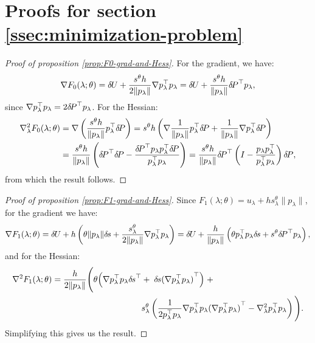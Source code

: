\documentclass[smallcondensed]{svjour3}
\begin{document}
\section{Proofs for section\@
  \ref{ssec:minimization-problem}}\label{sec:minimization-proofs}

\begin{proof}[Proof of proposition \ref{prop:F0-grad-and-Hess}]
  For the gradient, we have:
  \begin{equation*}
    \nabla F_0(\lambda; \theta) = {\delta \hspace{-0.09em} U} + \frac{s^{\theta} h}{2 \|p_\lambda\|} \nabla p_\lambda^\top p_\lambda = {\delta \hspace{-0.09em} U} + \frac{s^{\theta} h}{\|p_\lambda\|} {\delta \hspace{-0.14em} P}^\top p_\lambda,
  \end{equation*}
  since
  $\nabla p_\lambda^\top p_\lambda = 2 {\delta \hspace{-0.14em} P}^\top
  p_\lambda$. For the Hessian:
  \begin{align*}
    \nabla^2_\lambda F_0(\lambda; \theta) &= \nabla \left(\frac{s^{\theta} h}{\|p_\lambda\|} p_\lambda^\top {\delta \hspace{-0.14em} P}\right) = s^{\theta} h \left(\nabla \frac{1}{\|p_\lambda\|} p_\lambda^\top {\delta \hspace{-0.14em} P} + \frac{1}{\|p_\lambda\|} \nabla p_\lambda^\top {\delta \hspace{-0.14em} P}\right) \\
    &= \frac{s^{\theta} h}{\|p_\lambda\|} \left({\delta \hspace{-0.14em} P}^\top {\delta \hspace{-0.14em} P} - \frac{{\delta \hspace{-0.14em} P}^\top p_\lambda p_\lambda^\top {\delta \hspace{-0.14em} P}}{p_\lambda^\top p_\lambda}\right) = \frac{s^{\theta} h}{\|p_\lambda\|} {\delta \hspace{-0.14em} P}^\top \left(I - \frac{p_\lambda p_\lambda^\top}{p_\lambda^\top p_\lambda}\right) {\delta \hspace{-0.14em} P},
  \end{align*}
  from which the result follows.
\end{proof}

\begin{proof}[Proof of proposition \ref{prop:F1-grad-and-Hess}]
  Since
  $F_1(\lambda; \theta) = u_\lambda + h s^{\theta}_\lambda \|p_\lambda\|$,
  for the gradient we have:
  \begin{equation*}
    \nabla F_1(\lambda; \theta) = {\delta \hspace{-0.09em} U} + h \left(\theta \|p_\lambda\| {\delta \hspace{-0.1em} s} + \frac{s^{\theta}_\lambda}{2\|p_\lambda\|} \nabla p_\lambda^\top p_\lambda\right) = {\delta \hspace{-0.09em} U} + \frac{h}{\|p_\lambda\|} \left(\theta p_\lambda^\top p_\lambda {\delta \hspace{-0.1em} s} + s^{\theta} {\delta \hspace{-0.14em} P}^\top p_\lambda\right),
  \end{equation*}
  and for the Hessian:
  \begin{equation*}
    \begin{aligned}
      \nabla^2 F_1(\lambda; \theta) = \frac{h}{2 \|p_\lambda\|} \Bigg(\theta \Big(\nabla p_\lambda^\top p_\lambda {\delta \hspace{-0.1em} s}^\top &+\; {\delta \hspace{-0.1em} s} {(\nabla p_\lambda^\top p_\lambda)}^\top\Big) \;+ \\
      &s^{\theta}_\lambda \left(\frac{1}{2 p_\lambda^\top p_\lambda} \nabla p_\lambda^\top p_\lambda {(\nabla p_\lambda^\top p_\lambda)}^\top - \nabla^2_\lambda p_\lambda^\top p_\lambda\right) \Bigg).
    \end{aligned}
  \end{equation*}
  Simplifying this gives us the result.
\end{proof}
\end{document}
